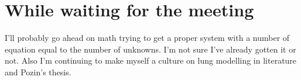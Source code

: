 \documentclass[11pt]{article}
\begin{document}
\section{While waiting for the meeting}
I'll probably go ahead on math trying to get a proper system with a number of equation equal to the number of unknowns. I'm not sure I've already gotten it or not. Also I'm continuing to make myself a culture on lung modelling in literature and Pozin's thesis.
%
\end{document}
